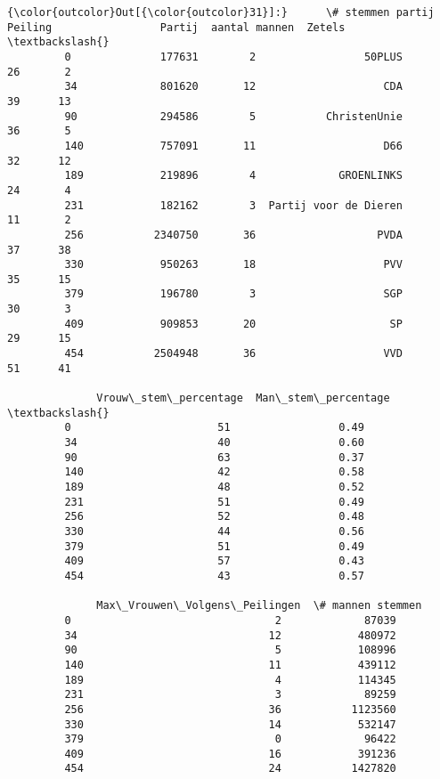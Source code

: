 \documentclass{article}
\begin{document}
            \begin{Verbatim}[commandchars=\\\{\}]
{\color{outcolor}Out[{\color{outcolor}31}]:}      \# stemmen partij  Peiling                 Partij  aantal mannen  Zetels  \textbackslash{}
         0              177631        2                 50PLUS             26       2   
         34             801620       12                    CDA             39      13   
         90             294586        5           ChristenUnie             36       5   
         140            757091       11                    D66             32      12   
         189            219896        4             GROENLINKS             24       4   
         231            182162        3  Partij voor de Dieren             11       2   
         256           2340750       36                   PVDA             37      38   
         330            950263       18                    PVV             35      15   
         379            196780        3                    SGP             30       3   
         409            909853       20                     SP             29      15   
         454           2504948       36                    VVD             51      41   
         
              Vrouw\_stem\_percentage  Man\_stem\_percentage  \textbackslash{}
         0                       51                 0.49   
         34                      40                 0.60   
         90                      63                 0.37   
         140                     42                 0.58   
         189                     48                 0.52   
         231                     51                 0.49   
         256                     52                 0.48   
         330                     44                 0.56   
         379                     51                 0.49   
         409                     57                 0.43   
         454                     43                 0.57   
         
              Max\_Vrouwen\_Volgens\_Peilingen  \# mannen stemmen  
         0                                2             87039  
         34                              12            480972  
         90                               5            108996  
         140                             11            439112  
         189                              4            114345  
         231                              3             89259  
         256                             36           1123560  
         330                             14            532147  
         379                              0             96422  
         409                             16            391236  
         454                             24           1427820  
\end{Verbatim}
        
\end{document}
